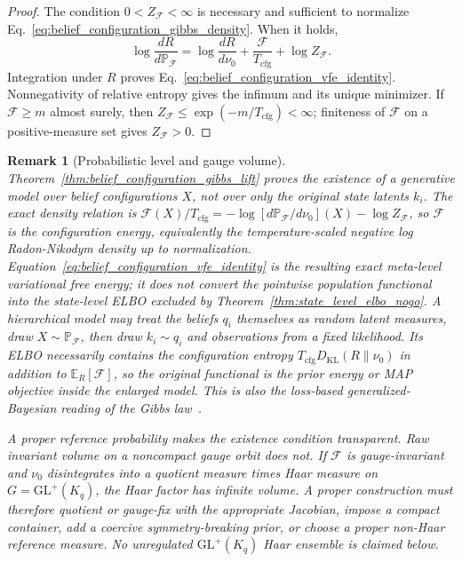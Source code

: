 \documentclass[11pt]{article}
\newtheorem{remark}{Remark}
\begin{document}
\begin{proof}
The condition $0<Z_{\mathcal{F}}<\infty$ is necessary and sufficient to normalize Eq.~\eqref{eq:belief_configuration_gibbs_density}. When it holds,
\begin{equation}
\log\frac{dR}{d\mathbb{P}_{\mathcal{F}}}
=\log\frac{dR}{d\nu_0}
+\frac{\mathcal{F}}{T_{\mathrm{cfg}}}
+\log Z_{\mathcal{F}}.
\label{eq:gibbs_lift_radon_nikodym_identity}
\end{equation}
Integration under $R$ proves Eq.~\eqref{eq:belief_configuration_vfe_identity}. Nonnegativity of relative entropy gives the infimum and its unique minimizer. If $\mathcal{F}\ge m$ almost surely, then $Z_{\mathcal{F}}\le\exp(-m/T_{\mathrm{cfg}})<\infty$; finiteness of $\mathcal{F}$ on a positive-measure set gives $Z_{\mathcal{F}}>0$.
\end{proof}

\begin{remark}[Probabilistic level and gauge volume]
\label{rem:gibbs_lift_interpretation}
Theorem~\ref{thm:belief_configuration_gibbs_lift} proves the existence of a generative model over belief configurations $X$, not over only the original state latents $k_i$. The exact density relation is $\mathcal{F}(X)/T_{\mathrm{cfg}}=-\log[d\mathbb{P}_{\mathcal{F}}/d\nu_0](X)-\log Z_{\mathcal{F}}$, so $\mathcal{F}$ is the configuration energy, equivalently the temperature-scaled negative log Radon-Nikodym density up to normalization. Equation~\eqref{eq:belief_configuration_vfe_identity} is the resulting exact meta-level variational free energy; it does not convert the pointwise population functional into the state-level ELBO excluded by Theorem~\ref{thm:state_level_elbo_nogo}. A hierarchical model may treat the beliefs $q_i$ themselves as random latent measures, draw $X\sim\mathbb{P}_{\mathcal{F}}$, then draw $k_i\sim q_i$ and observations from a fixed likelihood. Its ELBO necessarily contains the configuration entropy $T_{\mathrm{cfg}}D_{\mathrm{KL}}(R\|\nu_0)$ in addition to $\mathbb{E}_R[\mathcal{F}]$, so the original functional is the prior energy or MAP objective inside the enlarged model. This is also the loss-based generalized-Bayesian reading of the Gibbs law~\cite{BissiriHolmesWalker2016}.

A proper reference probability makes the existence condition transparent. Raw invariant volume on a noncompact gauge orbit does not. If $\mathcal{F}$ is gauge-invariant and $\nu_0$ disintegrates into a quotient measure times Haar measure on $G=\mathrm{GL}^+(K_q)$, the Haar factor has infinite volume. A proper construction must therefore quotient or gauge-fix with the appropriate Jacobian, impose a compact container, add a coercive symmetry-breaking prior, or choose a proper non-Haar reference measure. No unregulated $\mathrm{GL}^+(K_q)$ Haar ensemble is claimed below.
\end{remark}
\end{document}
